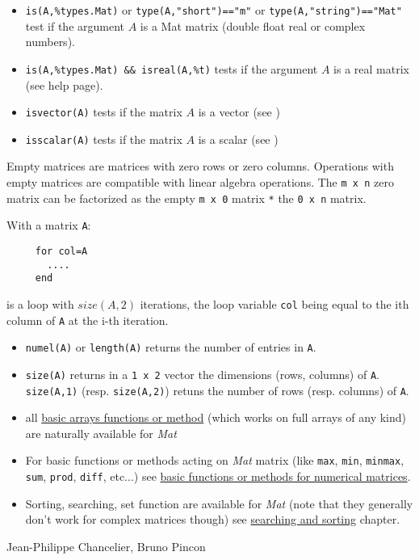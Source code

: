 \begin{itemize}
    \item \verb+is(A,%types.Mat)+ or \verb+type(A,"short")=="m"+ or \verb+type(A,"string")=="Mat"+ 
     test if the argument $A$ is a Mat matrix (double float real or complex numbers).
    \item \verb+is(A,%types.Mat) && isreal(A,%t)+ tests if the argument $A$ is a real matrix (see
                      help page).
    \item \verb+isvector(A)+ tests if the matrix $A$ is a vector (see )
    \item \verb+isscalar(A)+ tests if the matrix $A$ is a scalar (see )
\end{itemize}


Empty matrices are matrices with zero rows or zero columns. Operations with empty matrices
are compatible with linear algebra operations. The \verb+m x n+ zero matrix can be 
factorized as the empty \verb+m x 0+ matrix \verb+*+ the \verb+0 x n+ matrix. 




With a matrix \verb+A+:
\begin{verbatim}
     for col=A
       ....
     end
\end{verbatim} 
is a loop with $size(A,2)$ iterations, the loop 
variable  \verb+col+ being equal to the ith column of \verb+A+ at the i-th iteration.

\begin{itemize}
   \item \verb+numel(A)+ or \verb+length(A)+ returns the number of entries in \verb+A+.
   \item \verb+size(A)+ returns in a \verb+1 x 2+ vector the dimensions (rows, columns)
of \verb+A+. \verb+size(A,1)+ (resp. \verb+size(A,2)+) retuns the number of rows 
(resp. columns) of \verb+A+.
   \item all \hyperlink{arrays}{basic arrays functions or method} (which works on full arrays of any kind) 
     are naturally available for \emph{Mat} 
   \item For basic functions or methods acting on \emph{Mat} matrix (like \verb+max+, \verb+min+, \verb+minmax+,
     \verb+sum+, \verb+prod+, \verb+diff+, etc...) see \hyperlink{basicnumarrays}{basic functions or methods for numerical matrices}.
    \item Sorting, searching, set function are available for \emph{Mat}  (note that they generally don't work for complex matrices
      though) see \hyperlink{searchandsort}{searching and sorting} chapter.
\end{itemize}


\begin{manseealso}

\end{manseealso}

\begin{authors}
   Jean-Philippe Chancelier, Bruno Pincon
\end{authors}
